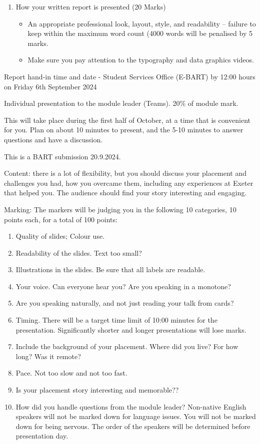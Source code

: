 \documentclass[11pt]{article}
\begin{document}
\begin{enumerate}
\begin{enumerate}
\begin{itemize}
\end{itemize}
\end{enumerate}
\item How your written report is presented (20 Marks)
\begin{itemize}
\item An appropriate professional look, layout, style, and readability – failure to keep within the maximum word count (4000 words will be penalised by 5 marks.
\item Make sure you pay attention to the typography and data graphics videos.
\end{itemize}
\end{enumerate}

Report hand-in time and date - Student Services Office (E-BART) by 12:00 hours on Friday 6th September 2024

Individual presentation to the module leader (Teams). 20\% of module mark.

This will take place during the first half of October, at a time that is convenient for you. Plan
on about 10 minutes to present, and the 5-10 minutes to answer questions and have a
discussion.

This is a BART submission 20.9.2024.

Content: there is a lot of flexibility, but you should discuss your placement and challenges
you had, how you overcame them, including any experiences at Exeter that helped you. The
audience should find your story interesting and engaging.

Marking: The markers will be judging you in the following 10 categories, 10 points each, for
a total of 100 points:

\begin{enumerate}
\item Quality of slides; Colour use.
\item Readability of the slides. Text too small?
\item Illustrations in the slides. Be sure that all labels are readable.
\item Your voice. Can everyone hear you? Are you speaking in a monotone?
\item Are you speaking naturally, and not just reading your talk from cards?
\item Timing. There will be a target time limit of 10:00 minutes for the presentation. Significantly shorter and longer presentations will lose marks.
\item Include the background of your placement. Where did you live? For how long? Was it remote?
\item Pace. Not too slow and not too fast.
\item Is your placement story interesting and memorable??
\item How did you handle questions from the module leader?  Non-native English speakers will not be marked down for language issues. You will not be marked down for being nervous. The order of the speakers will be determined before presentation day.
\end{enumerate}
\end{document}
